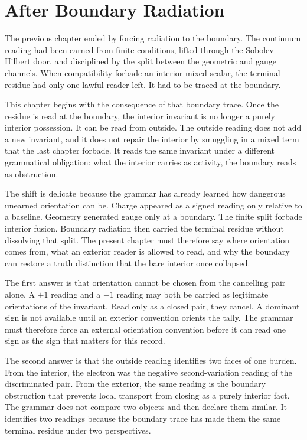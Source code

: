 \section{After Boundary Radiation}

The previous chapter ended by forcing radiation to the boundary. The
continuum reading had been earned from finite conditions, lifted through the
Sobolev--Hilbert door, and disciplined by the split between the geometric and
gauge channels. When compatibility forbade an interior mixed scalar, the
terminal residue had only one lawful reader left. It had to be traced at the
boundary.

This chapter begins with the consequence of that boundary trace. Once the
residue is read at the boundary, the interior invariant is no longer a purely
interior possession. It can be read from outside. The outside reading does
not add a new invariant, and it does not repair the interior by smuggling in a
mixed term that the last chapter forbade. It reads the same invariant under a
different grammatical obligation: what the interior carries as activity, the
boundary reads as obstruction.

The shift is delicate because the grammar has already learned how dangerous
unearned orientation can be. Charge appeared as a signed reading only
relative to a baseline. Geometry generated gauge only at a boundary. The
finite split forbade interior fusion. Boundary radiation then carried the
terminal residue without dissolving that split. The present chapter must
therefore say where orientation comes from, what an exterior reader is allowed
to read, and why the boundary can restore a truth distinction that the bare
interior once collapsed.

The first answer is that orientation cannot be chosen from the cancelling
pair alone. A \(+1\) reading and a \(-1\) reading may both be carried as
legitimate orientations of the invariant. Read only as a closed pair, they
cancel. A dominant sign is not available until an exterior convention orients
the tally. The grammar must therefore force an external orientation
convention before it can read one sign as the sign that matters for this
record.

The second answer is that the outside reading identifies two faces of one
burden. From the interior, the electron was the negative second-variation
reading of the discriminated pair. From the exterior, the same reading is the
boundary obstruction that prevents local transport from closing as a purely
interior fact. The grammar does not compare two objects and then declare them
similar. It identifies two readings because the boundary trace has made them
the same terminal residue under two perspectives.

